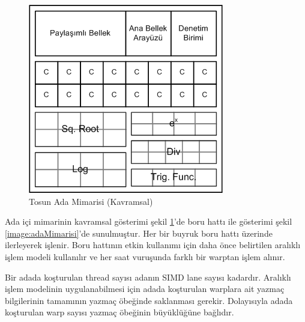 \begin{figure}[h] \label{image:adaMimarisiEski} 
\centering \includegraphics{gorsel/adaMimarisiEski.png} \caption{Tosun Ada Mimarisi (Kavramsal)}  
\end{figure}
Ada içi mimarinin kavramsal gösterimi şekil \ref{image:adaMimarisiEski}'de boru hattı ile gösterimi şekil \ref{image:adaMimarisi}'de sunulmuştur. Her bir buyruk boru hattı üzerinde ilerleyerek işlenir. Boru hattının etkin kullanımı için daha önce belirtilen aralıklı işlem modeli kullanılır ve her saat vuruşunda farklı bir warptan işlem alınır. \par
Bir adada koşturulan thread sayısı adanın SIMD lane sayısı kadardır. Aralıklı işlem modelinin uygulanabilmesi için adada koşturulan warplara ait yazmaç bilgilerinin tamamının yazmaç öbeğinde saklanması gerekir. Dolayısıyla adada koşturulan warp sayısı yazmaç öbeğinin büyüklüğüne bağlıdır.\par

